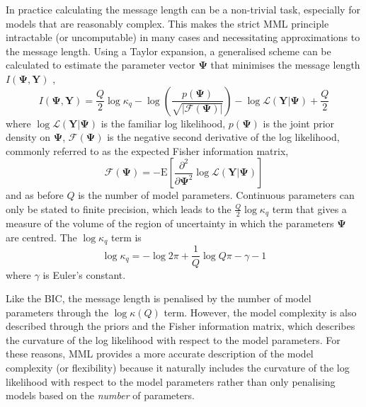\documentclass[twocolumn]{aastex62}
\newcommand{\todo}[1]{\textcolor{red}{#1}}
\newcommand{\vect}[1]{\boldsymbol{\mathbf{#1}}}
\renewcommand{\vec}[1]{\vect{#1}}
\newcommand{\data}{\textbf{Y}}
\newcommand{\vecdata}{\vec\data}
\newcommand{\likelihood}{\mathcal{L}}
\begin{document}
In practice calculating the message length can be a non-trivial task, 
especially for models that are reasonably complex. This makes the strict MML
principle intractable (or uncomputable) in many cases and necessitating 
approximations to the message length. Using a Taylor expansion, a generalised
scheme can be calculated to estimate the parameter vector $\vec\Psi$ that
minimises the message length ${I}(\vec\Psi,\vecdata)$ \citep{Wallace:1987},
\begin{equation}
	{I}(\vec\Psi,\vecdata) = \frac{Q}{2}\log\kappa_q - \log\left(\frac{p(\vec\Psi)}{\sqrt{|\mathcal{F}(\vec\Psi)|}}\right) - \log\mathcal{L}\left(\vecdata|\vec\Psi\right) + \frac{Q}{2} \label{eq:mml} 
\end{equation}
\noindent{}where $\log\likelihood(\vecdata|\vec\Psi)$ is the familiar
log likelihood, $p(\vec\Psi)$ is the joint prior density on $\vec\Psi$,
$\mathcal{F}(\vec\Psi)$ is the negative second derivative of the log likelihood,
commonly referred to as the expected Fisher information matrix,
\begin{equation}
	\mathcal{F}(\vec\Psi) = -\textrm{E}\left[\frac{\partial^2}{\partial\vec\Psi^2}\log\likelihood(\vecdata|\vec\Psi)\right]
\end{equation}
\noindent{}and as before $Q$ is the number of model parameters.
Continuous parameters can only be stated to finite precision, which leads
to the $\frac{Q}{2}\log\kappa_q$ term that gives a measure of the volume of the region of
uncertainty in which the parameters $\vec\Psi$ are centred. The $\log\kappa_q$
term is
\begin{equation}
	\log\kappa_q = -\log{2\pi} + \frac{1}{Q}\log{Q\pi} - \gamma - 1
\end{equation}
\noindent{}where $\gamma$ is Euler's constant.

Like the BIC, the message length is penalised by the number of model parameters
through the $\log\kappa(Q)$ term. However, the model complexity is also 
described through the priors and the Fisher information matrix, which
describes the curvature of the log likelihood with respect to the model
parameters. For these reasons, MML provides a more accurate description of
the model complexity (or flexibility) because it naturally includes the 
curvature of the log likelihood with respect to the model parameters
rather than only penalising models based on the \emph{number} of
parameters.

\end{document}
